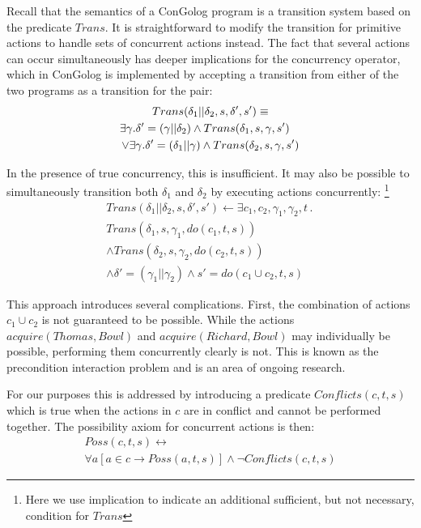 \documentclass[letterpaper]{article}
\begin{document}
Recall that the semantics of a ConGolog program is a transition system
based on the predicate $Trans$. It is straightforward to modify the
transition for primitive actions to handle sets of concurrent actions
instead. The fact that several actions can occur simultaneously has
deeper implications for the concurrency operator, which in ConGolog
is implemented by accepting a transition from either of the two programs
as a transition for the pair:
\begin{multline}
Trans(\delta_{1}||\delta_{2},s,\delta',s')\equiv\\
\shoveright{\exists\gamma.\delta'=(\gamma||\delta_{2})\wedge Trans(\delta_{1},s,\gamma,s')}\\
\vee\exists\gamma.\delta'=(\delta_{1}||\gamma)\wedge Trans(\delta_{2},s,\gamma,s')
\end{multline}

In the presence of true concurrency, this is insufficient. It may
also be possible to simultaneously transition both $\delta_{1}$ and
$\delta_{2}$ by executing actions concurrently:%
\footnote{Here we use implication to indicate an additional sufficient, but
not necessary, condition for $Trans$ %
}
\begin{multline}
Trans(\delta_{1}||\delta_{2},s,\delta',s')\leftarrow \exists c_{1},c_{2},\gamma_{1},\gamma_{2},t\,.\,\\
 Trans(\delta_{1},s,\gamma_{1},do(c_{1},t,s))\\
 \wedge Trans(\delta_{2},s,\gamma_{2},do(c_{2},t,s))\\
 \wedge\delta'=(\gamma_{1}||\gamma_{2})\wedge s'=do(c_{1}\cup c_{2},t,s)
\end{multline}


This approach introduces several complications. First, the combination
of actions $c_{1}\cup c_{2}$ is not guaranteed to be possible. While
the actions $acquire(Thomas,Bowl)$ and $acquire(Richard,Bowl)$ may
individually be possible, performing them concurrently clearly is
not. This is known as the precondition interaction problem \cite{pinto94temporal}
and is an area of ongoing research.

For our purposes this is addressed by introducing a predicate $Conflicts(c,t,s)$
which is true when the actions in $c$ are in conflict and cannot
be performed together. The possibility axiom for concurrent actions
is then:
\begin{multline}
Poss(c,t,s)\leftrightarrow\\
\forall a\left[a\in c\rightarrow Poss(a,t,s)\right]\wedge\neg Conflicts(c,t,s)
\end{multline}
\end{document}
